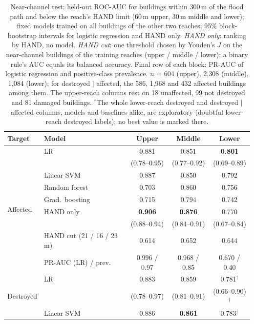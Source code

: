 \documentclass[journal,a4paper]{IEEEtran}
\begin{document}
\begin{table}[t]
\centering\scriptsize
\setlength{\tabcolsep}{2.5pt}
\caption{Near-channel test: held-out ROC-AUC for buildings within 300\,m of the flood path and below the reach's HAND limit (60\,m upper, 30\,m middle and lower); fixed models trained on all buildings of the other two reaches; 95\% block-bootstrap intervals for logistic regression and HAND only. \emph{HAND only}: ranking by HAND, no model. \emph{HAND cut}: one threshold chosen by Youden's $J$ on the near-channel buildings of the training reaches (upper / middle / lower); a binary rule's AUC equals its balanced accuracy. Final row of each block: PR-AUC of logistic regression and positive-class prevalence. $n$ = 604 (upper), 2,308 (middle), 1,084 (lower); for destroyed $\mid$ affected, the 586, 1,968 and 432 affected buildings among them. The upper-reach columns rest on 18 unaffected, 99 not destroyed and 81 damaged buildings. $^\dagger$The whole lower-reach destroyed and destroyed $\mid$ affected columns, models and baselines alike, are exploratory (doubtful lower-reach destroyed labels); no best value is marked there.}\label{tab:near}
\begin{tabular}{@{}llccc@{}}
\toprule
\textbf{Target} & \textbf{Model} & \textbf{Upper} & \textbf{Middle} & \textbf{Lower}\\
\midrule
\multirow{9}{*}{Affected} & LR & 0.881 & 0.851 & \textbf{0.801}\\
 & & {\scriptsize(0.78--0.95)} & {\scriptsize(0.77--0.92)} & {\scriptsize(0.69--0.89)}\\
 & Linear SVM & 0.887 & 0.850 & 0.792\\
 & Random forest & 0.703 & 0.860 & 0.756\\
 & Grad.\ boosting & 0.715 & 0.794 & 0.742\\
 & HAND only & \textbf{0.906} & \textbf{0.876} & 0.770\\
 & & {\scriptsize(0.88--0.94)} & {\scriptsize(0.84--0.91)} & {\scriptsize(0.67--0.84)}\\
 & HAND cut (21 / 16 / 23\,m) & 0.614 & 0.652 & 0.644\\
 & PR-AUC (LR) / prev.\ & 0.996 / 0.97 & 0.968 / 0.85 & 0.670 / 0.40\\
\midrule
\multirow{9}{*}{Destroyed} & LR & 0.883 & 0.859 & 0.781$^\dagger$\\
 & & {\scriptsize(0.78--0.97)} & {\scriptsize(0.81--0.91)} & {\scriptsize(0.66--0.90)}$^\dagger$\\
 & Linear SVM & 0.886 & \textbf{0.861} & 0.783$^\dagger$\\

\end{tabular}
\end{table}
\end{document}
